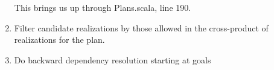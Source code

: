 \documentclass{report}
\begin{document}
\begin{enumerate}
\begin{description}
	\end{description}

      This brings us up through Plans.scala, line 190.

\item Filter candidate realizations by those allowed in the cross-product of realizations for the plan.

\item Do backward dependency resolution starting at goals

\end{enumerate}



\end{document}
